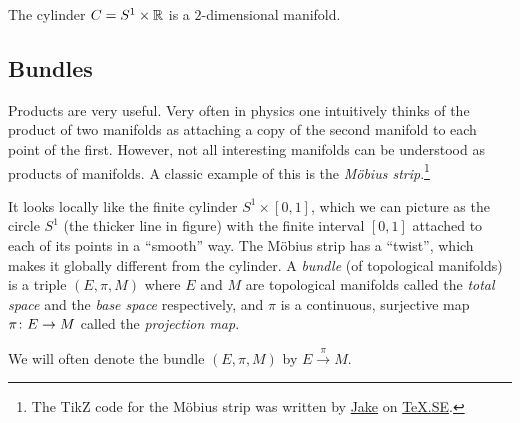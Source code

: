 \be
The cylinder $C=S^1\times \mathbb{R}$ is a $2$-dimensional manifold.
\ee

\subsection{Bundles}

Products are very useful. Very often in physics one intuitively thinks of the product of two manifolds as attaching a copy of the second manifold to each point of the first.  However, not all interesting manifolds can be understood as products of manifolds. A classic example of this is the \emph{M\"obius strip}.\footnote{The TikZ code for the M\"obius strip was written by \href{http://pgfplots.net/tikz/examples/author/jake/}{Jake} on \href{https://tex.stackexchange.com/questions/118563/moebius-strip-using-tikz}{TeX.SE}.}
\vspace{-0.1cm}
\begin{center}
\end{center}
It looks locally like the finite cylinder $S^1\times [0,1]$, which we can picture as the circle $S^1$ (the thicker line in figure) with the finite interval $[0,1]$ attached to each of its points in a ``smooth'' way. The M\"obius strip has a ``twist'', which makes it globally different from the cylinder.
\bd
A \emph{bundle} (of topological manifolds) is a triple $(E,\pi,M)$ where $E$ and $M$ are topological manifolds called the \emph{total space} and the \emph{base space} respectively, and $\pi$ is a continuous, surjective map $\pi\colon E \to M$ called the \emph{projection map}.
\ed

We will often denote the bundle $(E,\pi,M)$ by $E\xrightarrow{\,\pi\,}M$.

